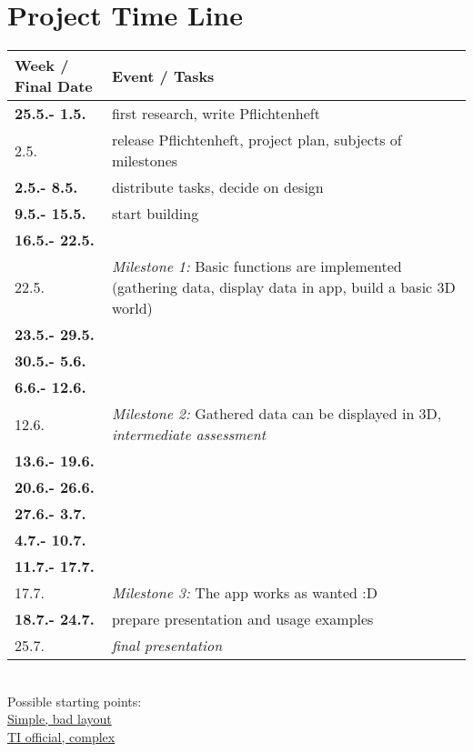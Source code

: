 \section{Project Time Line}


\begin{tabular}{l|p{12cm}}

\textbf{Week / Final Date}  & \textbf{Event / Tasks} \\ \hline

\textbf{25.5.- 1.5.} & first research, write Pflichtenheft \\ 
2.5. & release Pflichtenheft, project plan, subjects of milestones\\ \hline
\textbf{2.5.- 8.5.} & distribute tasks, decide on design\\ 
\textbf{9.5.- 15.5.} & start building \\ 
\textbf{16.5.- 22.5.} & \\
22.5. & \textit{Milestone 1:} Basic functions are implemented (gathering data, display data in app, build a basic 3D world) \\ \hline
\textbf{23.5.- 29.5.} &  \\
\textbf{30.5.- 5.6.} & \\
\textbf{6.6.- 12.6.} & \\
12.6. & \textit{Milestone 2:} Gathered data can be displayed in 3D, \textit{intermediate assessment} \\ \hline
\textbf{13.6.- 19.6.} & \\
\textbf{20.6.- 26.6.} & \\
\textbf{27.6.- 3.7.} & \\
\textbf{4.7.- 10.7.} & \\
\textbf{11.7.- 17.7.} & \\
17.7. & \textit{Milestone 3:} The app works as wanted :D \\ \hline
\textbf{18.7.- 24.7.} & prepare presentation and usage examples\\
25.7. & \textit{final presentation }

\end{tabular} \\



Possible starting points: \\
\href{https://bitbucket.org/StylingAndroid/bluetoothle/src/1fe191cf34f34f9917b1d0d62c617c607fe3df4d/src/main/java/com/stylingandroid/ble/?at=Part2}{Simple, bad layout} \\
\href{https://git.ti.com/sensortag-20-android/sensortag-20-android/trees/master/sensortag20/BleSensorTag/src/main/java/com/example/ti}{TI official, complex}
